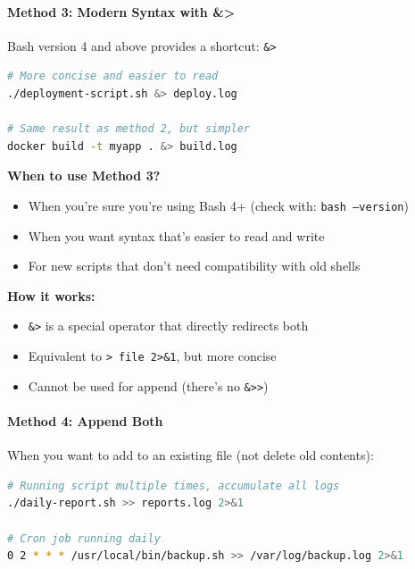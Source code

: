 \paragraph{Method 3: Modern Syntax with \&>}

Bash version 4 and above provides a shortcut: \texttt{\&>}

\begin{lstlisting}[language=bash, caption={Method 3 example - modern syntax}]
# More concise and easier to read
./deployment-script.sh &> deploy.log

# Same result as method 2, but simpler
docker build -t myapp . &> build.log
\end{lstlisting}

\textbf{When to use Method 3?}
\begin{itemize}
	\item When you're sure you're using Bash 4+ (check with: \texttt{bash --version})
	\item When you want syntax that's easier to read and write
	\item For new scripts that don't need compatibility with old shells
\end{itemize}

\textbf{How it works:}
\begin{itemize}
	\item \texttt{\&>} is a special operator that directly redirects both
	\item Equivalent to \texttt{> file 2>\&1}, but more concise
	\item Cannot be used for append (there's no \texttt{\&>>})
\end{itemize}

\paragraph{Method 4: Append Both}

When you want to add to an existing file (not delete old contents):

\begin{lstlisting}[language=bash, caption={Method 4 example - append both}]
# Running script multiple times, accumulate all logs
./daily-report.sh >> reports.log 2>&1

# Cron job running daily
0 2 * * * /usr/local/bin/backup.sh >> /var/log/backup.log 2>&1
\end{lstlisting}

